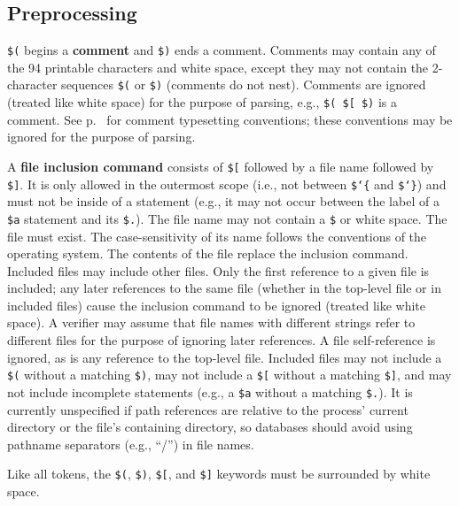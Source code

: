 \subsection{Preprocessing}

\texttt{\$(} begins a {\bf comment} and \texttt{\$)} ends a comment.  Comments may contain any of
the 94 printable characters and white space, except they may not contain the
2-character sequences \texttt{\$(} or \texttt{\$)} (comments do not nest).  Comments are ignored (treated
like white space) for the purpose of parsing, e.g.,
\texttt{\$( \$[ \$)} is a comment.
See p.~\pageref{mathcomments} for comment typesetting conventions; these
conventions may be ignored for the purpose of parsing.

A {\bf file inclusion command} consists of \texttt{\$[} followed by a file name
followed by \texttt{\$]}.
It is only allowed in the outermost scope (i.e., not between
\texttt{\$\char`\{} and \texttt{\$\char`\}})
and must not be inside of a statement (e.g., it may not occur
between the label of a \texttt{\$a} statement and its \texttt{\$.}).
The file name may not
contain a \texttt{\$} or white space.  The file must exist.
The case-sensitivity
of its name follows the conventions of the operating system.  The contents of
the file replace the inclusion command.
Included files may include other files.
Only the first reference to a given file is included; any later
references to the same file (whether in the top-level file or in included
files) cause the inclusion command to be ignored (treated like white space).
A verifier may assume that file names with different strings
refer to different files for the purpose of ignoring later references.
A file self-reference is ignored, as is any reference to the top-level file.
Included files may not include a \texttt{\$(} without a matching \texttt{\$)},
may not include a \texttt{\$[} without a matching \texttt{\$]}, and may
not include incomplete statements (e.g., a \texttt{\$a} without a matching
\texttt{\$.}).
It is currently unspecified if path references are relative to the process'
current directory or the file's containing directory, so databases should
avoid using pathname separators (e.g., ``/'') in file names.

Like all tokens, the \texttt{\$(}, \texttt{\$)}, \texttt{\$[}, and \texttt{\$]} keywords
must be surrounded by white space.

